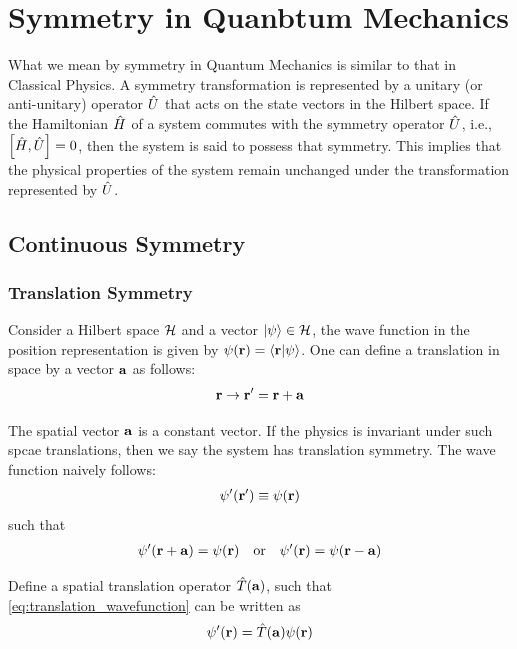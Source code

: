 \chapter{Symmetry in Quanbtum Mechanics} \label{chap:Symmetry}

What we mean by symmetry in Quantum Mechanics is similar to that in Classical Physics. A symmetry transformation is represented by a unitary (or anti-unitary) operator $\hat{U}$ that acts on the state vectors in the Hilbert space. If the Hamiltonian $\hat{H}$ of a system commutes with the symmetry operator $\hat{U}$, i.e., $\left[ \hat{H} , \hat{U} \right]=0$, then the system is said to possess that symmetry. This implies that the physical properties of the system remain unchanged under the transformation represented by $\hat{U}$.

\section{Continuous Symmetry}
\subsection{Translation Symmetry} \label{sec:translation_symmetry}

Consider a Hilbert space $\mathcal{H}$ and a vector $\ket{\psi} \in \mathcal{H}$, the wave function in the position representation is given by $\psi(\mathbf{r}) = \braket{\mathbf{r}|\psi}$. One can define a translation in space by a vector $\mathbf{a}$ as follows:
\begin{align}
    \mathbf{r} \rightarrow \mathbf{r}' = \mathbf{r} + \mathbf{a}
\end{align}

The spatial vector $\mathbf{a}$ is a constant vector. If the physics is invariant under such spcae translations, then we say the system has translation symmetry. The wave function naively follows: 
\begin{align}
    \psi'(\mathbf{r}') \equiv \psi(\mathbf{r}) \label{eq:translation_wavefunction}
\end{align}
such that 
\begin{align}
    \psi'(\mathbf{r} + \mathbf{a}) = \psi(\mathbf{r}) \quad \text{or} \quad \psi'(\mathbf{r}) = \psi(\mathbf{r} - \mathbf{a}) 
\end{align}

Define a spatial translation operator $\hat{T}(\mathbf{a})$, such that \cref{eq:translation_wavefunction} can be written as
\begin{align}
    \psi'(\mathbf{r}) = \hat{T}(\mathbf{a}) \psi (\mathbf{r})
\end{align}


